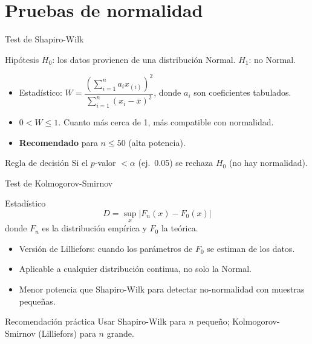 \documentclass[aspectratio=169]{beamer}
\begin{document}
\section{Pruebas de normalidad}

\begin{frame}{Test de Shapiro-Wilk}
  \begin{block}{Hipótesis}
    $H_0$: los datos provienen de una distribución Normal. \quad $H_1$: no Normal.
  \end{block}
  \bigskip
  \begin{itemize}
    \item Estadístico: $W = \dfrac{\left(\sum_{i=1}^n a_i x_{(i)}\right)^2}{\sum_{i=1}^n (x_i - \bar{x})^2}$, donde $a_i$ son coeficientes tabulados.
    \item $0 < W \le 1$. Cuanto más cerca de 1, más compatible con normalidad.
    \item \textbf{Recomendado} para $n \le 50$ (alta potencia).
  \end{itemize}
  \bigskip
  \begin{alertblock}{Regla de decisión}
    Si el $p$-valor $< \alpha$ (ej.\ 0.05) se rechaza $H_0$ (no hay normalidad).
  \end{alertblock}
\end{frame}

\begin{frame}{Test de Kolmogorov-Smirnov}
  \begin{block}{Estadístico}
    \[
      D = \sup_x |F_n(x) - F_0(x)|
    \]
    donde $F_n$ es la distribución empírica y $F_0$ la teórica.
  \end{block}
  \bigskip
  \begin{itemize}
    \item Versión de Lilliefors: cuando los parámetros de $F_0$ se estiman de los datos.
    \item Aplicable a cualquier distribución continua, no solo la Normal.
    \item Menor potencia que Shapiro-Wilk para detectar no-normalidad con muestras pequeñas.
  \end{itemize}
  \bigskip
  \begin{exampleblock}{Recomendación práctica}
    Usar Shapiro-Wilk para $n$ pequeño; Kolmogorov-Smirnov (Lilliefors) para $n$ grande.
  \end{exampleblock}
\end{frame}
\end{document}
